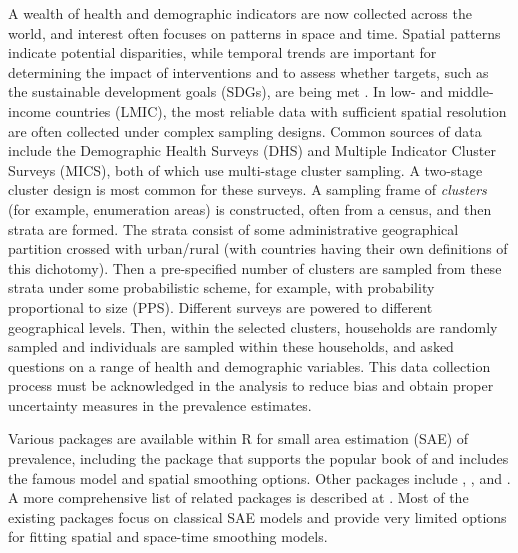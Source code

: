 A wealth of health and demographic indicators are now collected across the world, and interest often focuses on patterns in space and time. Spatial patterns indicate potential disparities, while temporal trends are important for determining the impact of interventions and to assess whether targets, such as the sustainable development goals (SDGs), are being met \citep{macfeely20}. In low- and middle-income countries (LMIC), the most reliable data with sufficient spatial resolution are often collected under complex sampling designs. Common sources of data include the Demographic Health Surveys (DHS) and Multiple Indicator Cluster Surveys (MICS), both of which use multi-stage cluster sampling. A two-stage cluster design is most common for these surveys. A sampling frame of \emph{clusters} (for example, enumeration areas) is constructed, often from a census, and then strata are formed. The strata consist of some administrative geographical partition crossed with urban/rural (with countries having their own definitions of this dichotomy). Then a pre-specified number of clusters are sampled from these strata under some probabilistic scheme, for example, with probability proportional to size (PPS). Different surveys are powered to different geographical levels. Then, within the selected clusters, households are randomly sampled and individuals are sampled within these households, and asked questions on a range of health and demographic variables. This data collection process must be acknowledged in the analysis to reduce bias and obtain proper uncertainty measures in the prevalence estimates.

Various packages are available within R for small area estimation (SAE) of prevalence, including the  package \citep{molina_marhuenda_15} that supports the popular book of \citet{rao_molina_15} and includes the famous \citet{fay_herriot_79} model and spatial smoothing options. Other packages include  \citep{rsae},  \citep{hbsae},  \citep{BayesSAE} and  \citep{permatasari2021msae}.
A more comprehensive list of related packages is described at . Most of the existing packages focus on classical SAE models and provide very limited options for fitting spatial and space-time smoothing models.

